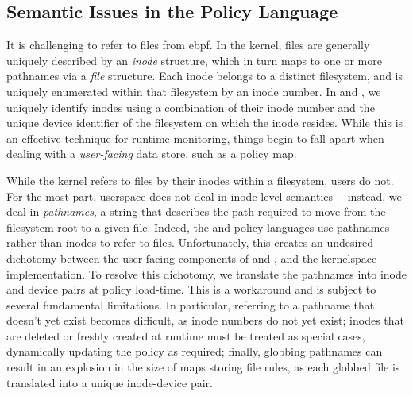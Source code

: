 \subsection{Semantic Issues in the Policy Language}%
\label{ss:disc-semantic-issues}

It is challenging to refer to files from \gls{ebpf}. In the kernel, files are generally uniquely
described by an \textit{inode} structure, which in turn maps to one or more pathnames via
a \textit{file} structure. Each inode belongs to a distinct filesystem, and is uniquely
enumerated within that filesystem by an inode number.  In \bpfbox{} and \bpfcontain{}, we
uniquely identify inodes using a combination of their inode number and the unique device
identifier of the filesystem on which the inode resides. While this is an effective
technique for runtime monitoring, things begin to fall apart when dealing with
a \textit{user-facing} data store, such as a policy map.

While the kernel refers to files by their inodes within a filesystem, users do not. For
the most part, userspace does not deal in inode-level semantics\,---\,instead, we deal in
\textit{pathnames}, a string that describes the path required to move from the filesystem
root to a given file. Indeed, the \bpfbox{} and \bpfcontain{} policy languages use
pathnames rather than inodes to refer to files. Unfortunately, this creates an undesired
dichotomy between the user-facing components of \bpfbox{} and \bpfcontain{}, and the
kernelspace implementation.  To resolve this dichotomy, we translate the pathnames into
inode and device pairs at policy load-time. This is a workaround and is subject to several
fundamental limitations. In particular, referring to a pathname that doesn't yet exist
becomes difficult, as inode numbers do not yet exist; inodes that are deleted or freshly
created at runtime must be treated as special cases, dynamically updating the policy as
required; finally, globbing pathnames can result in an explosion in the size of maps
storing file rules, as each globbed file is translated into a unique inode-device pair.

